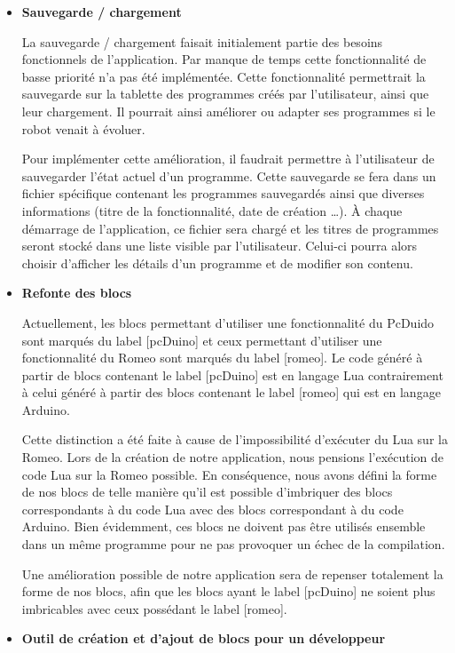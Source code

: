 \documentclass[12pt,francais]{report}
\begin{document}
\begin{itemize}

\item \textbf{Sauvegarde / chargement}

La sauvegarde / chargement faisait initialement partie des besoins fonctionnels de l'application. Par manque de temps cette fonctionnalité de basse priorité n'a pas été implémentée. Cette fonctionnalité permettrait la sauvegarde sur la tablette des programmes créés par l'utilisateur, ainsi que leur chargement. Il pourrait ainsi améliorer ou adapter ses programmes si le robot venait à évoluer.

Pour implémenter cette amélioration, il faudrait permettre à l'utilisateur de sauvegarder l'état actuel d'un programme. Cette sauvegarde se fera dans un fichier spécifique contenant les programmes sauvegardés ainsi que diverses informations (titre de la fonctionnalité, date de création …). À chaque démarrage de l'application, ce fichier sera chargé et les titres de programmes seront stocké dans une liste visible par l'utilisateur. Celui-ci pourra alors choisir d'afficher les détails d'un programme et de modifier son contenu.

\bigskip
\item \textbf{Refonte des blocs}

Actuellement, les blocs permettant d'utiliser une fonctionnalité du PcDuido sont marqués du label [pcDuino] et ceux permettant d'utiliser une fonctionnalité du Romeo sont marqués du label [romeo].
Le code généré à partir de blocs contenant le label [pcDuino] est en langage Lua contrairement à celui généré à partir des blocs contenant le label [romeo] qui est en langage Arduino.

Cette distinction a été faite à cause de l'impossibilité d'exécuter du Lua sur la Romeo. Lors de la création de notre application, nous pensions l'exécution de code Lua sur la Romeo possible. En conséquence, nous avons défini la forme de nos blocs de telle manière qu'il est possible d'imbriquer des blocs correspondants à du code Lua avec des blocs correspondant à du code Arduino. Bien évidemment, ces blocs ne doivent pas être utilisés ensemble dans un même programme pour ne pas provoquer un échec de la compilation.

Une amélioration possible de notre application sera de repenser totalement la forme de nos blocs, afin que les blocs ayant le label [pcDuino] ne soient plus imbricables avec ceux possédant le label [romeo].

\bigskip
\item \textbf{Outil de création et d'ajout de blocs pour un développeur}


\end{itemize}
\end{document}
